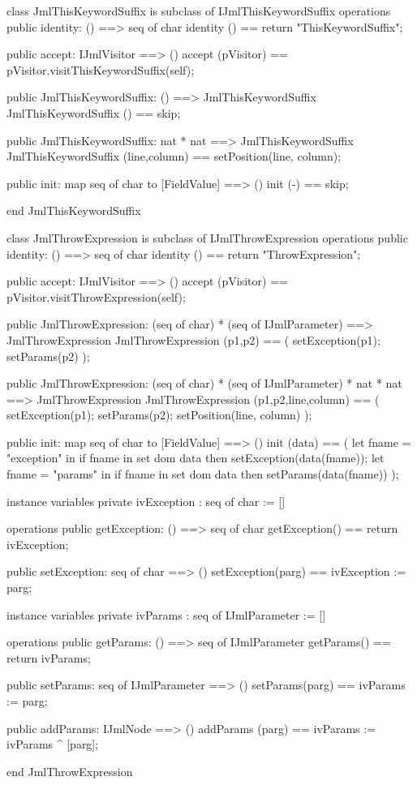 \begin{vdm_al}
class JmlThisKeywordSuffix is subclass of IJmlThisKeywordSuffix
operations
  public identity: () ==> seq of char
  identity () == return "ThisKeywordSuffix";

  public accept: IJmlVisitor ==> ()
  accept (pVisitor) == pVisitor.visitThisKeywordSuffix(self);

  public JmlThisKeywordSuffix:
    () ==> JmlThisKeywordSuffix
  JmlThisKeywordSuffix () == 
    skip;

  public JmlThisKeywordSuffix:
    nat *
    nat ==> JmlThisKeywordSuffix
  JmlThisKeywordSuffix (line,column) == 
    setPosition(line, column);

  public init: map seq of char to [FieldValue] ==> ()
  init (-) == skip;

end JmlThisKeywordSuffix
\end{vdm_al}

\begin{vdm_al}
class JmlThrowExpression is subclass of IJmlThrowExpression
operations
  public identity: () ==> seq of char
  identity () == return "ThrowExpression";

  public accept: IJmlVisitor ==> ()
  accept (pVisitor) == pVisitor.visitThrowExpression(self);

  public JmlThrowExpression:
    (seq of char) *
    (seq of IJmlParameter) ==> JmlThrowExpression
  JmlThrowExpression (p1,p2) == 
    ( setException(p1);
      setParams(p2) );

  public JmlThrowExpression:
    (seq of char) *
    (seq of IJmlParameter) *
    nat *
    nat ==> JmlThrowExpression
  JmlThrowExpression (p1,p2,line,column) == 
    ( setException(p1);
      setParams(p2);
      setPosition(line, column) );

  public init: map seq of char to [FieldValue] ==> ()
  init (data) ==
    ( let fname = "exception" in
        if fname in set dom data
        then setException(data(fname));
      let fname = "params" in
        if fname in set dom data
        then setParams(data(fname)) );

instance variables
  private ivException : seq of char := []

operations
  public getException: () ==> seq of char
  getException() == return ivException;

  public setException: seq of char ==> ()
  setException(parg) == ivException := parg;

instance variables
  private ivParams : seq of IJmlParameter := []

operations
  public getParams: () ==> seq of IJmlParameter
  getParams() == return ivParams;

  public setParams: seq of IJmlParameter ==> ()
  setParams(parg) == ivParams := parg;

  public addParams: IJmlNode ==> ()
  addParams (parg) == ivParams := ivParams ^ [parg];

end JmlThrowExpression
\end{vdm_al}

